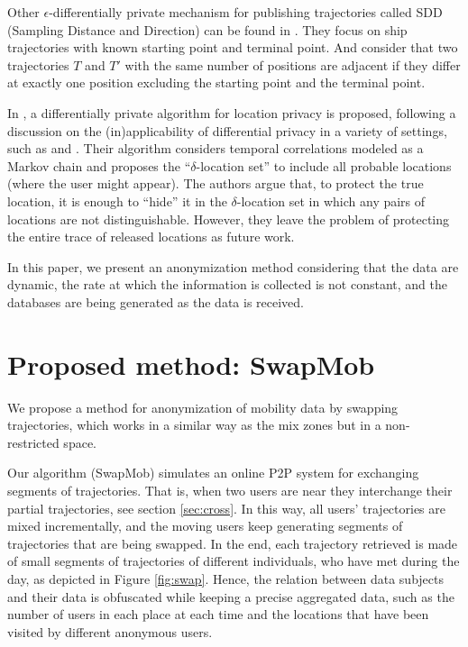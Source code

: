 \documentclass{llncs}
\begin{document}
Other $\epsilon$-differentially private mechanism for publishing trajectories called SDD (Sampling Distance and Direction) can be found in \cite{Jiang:2013}.
They focus on ship trajectories with known starting point and terminal point. 
And consider that two trajectories $T$ and $T'$ with the same number of positions are adjacent if they differ at exactly one position excluding the starting point and the terminal point.


In \cite{Xiao:2015}, a differentially private algorithm for location privacy is proposed, following a discussion on the (in)applicability of differential privacy in a variety of settings, such as \cite{Chatzik:2013} and  \cite{Kifer:2011}.
Their algorithm considers temporal correlations modeled as a Markov chain and proposes the ``$\delta$-location set'' to include all probable locations (where the user might appear). The authors argue that, to protect the true location, it is enough to “hide” it in the $\delta$-location set in which any pairs of locations are not distinguishable.
However, they leave the problem of protecting the entire trace of released locations as future work.


In this paper, we present an anonymization method considering that the data are dynamic, the rate at which the information is collected is not constant, and the databases are being generated as the data is received. 


\section{Proposed method: SwapMob}

We propose a method for anonymization of mobility data by swapping trajectories, which works in a similar way as the mix zones but in a non-restricted space.


Our algorithm (SwapMob) simulates an online P2P system for exchanging segments of trajectories. That is, when two users are near they interchange their partial trajectories, see section \ref{sec:cross}.
In this way, all users' trajectories are mixed incrementally, and the moving users keep generating segments of trajectories that are being swapped. In the end, each trajectory retrieved is made of small segments of trajectories of different individuals, who have met during the day, as depicted in Figure \ref{fig:swap}. Hence, the relation between data subjects and their data is obfuscated while keeping a precise aggregated data, such as the number of users in each place at each time and the locations that have been visited by different anonymous users. 
\end{document}
